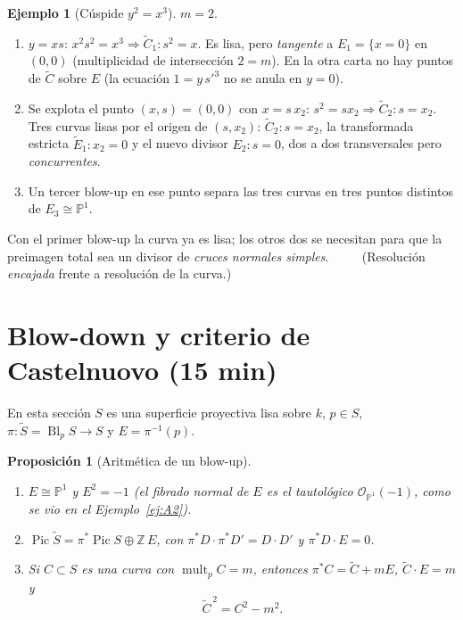 \documentclass[11pt,a4paper]{article}
\newcommand{\Bl}{\operatorname{Bl}}
\newcommand{\Pic}{\operatorname{Pic}}
\newcommand{\mult}{\operatorname{mult}}
\newcommand{\PP}{\mathbb{P}}
\newcommand{\ZZ}{\mathbb{Z}}
\newcommand{\cO}{\mathcal{O}}
\theoremstyle{plain}
\newtheorem{proposicion}[teorema]{Proposición}
\theoremstyle{definition}
\newtheorem{ejemplo}[teorema]{Ejemplo}
\theoremstyle{remark}
\begin{document}
\begin{ejemplo}[Cúspide $y^2=x^3$]\label{ej:cuspide}
$m=2$.
\begin{enumerate}[label=\textbf{Paso \arabic*.},leftmargin=*,itemsep=2pt]
\item $y=xs$: $x^2s^2=x^3\Rightarrow\tilde C_1\colon s^2=x$. Es lisa, pero \emph{tangente} a $E_1=\{x=0\}$ en $(0,0)$ (multiplicidad de intersección $2=m$). En la otra carta no hay puntos de $\tilde C$ sobre $E$ (la ecuación $1=y\,s'^3$ no se anula en $y=0$).
\item Se explota el punto $(x,s)=(0,0)$ con $x=s\,x_2$: $s^2=sx_2\Rightarrow\tilde C_2\colon s=x_2$. Tres curvas lisas por el origen de $(s,x_2)$: $\tilde C_2\colon s=x_2$, la transformada estricta $\tilde E_1\colon x_2=0$ y el nuevo divisor $E_2\colon s=0$, dos a dos transversales pero \emph{concurrentes}.
\item Un tercer blow-up en ese punto separa las tres curvas en tres puntos distintos de $E_3\cong\PP^1$.
\end{enumerate}
Con el primer blow-up la curva ya es lisa; los otros dos se necesitan para que la preimagen total sea un divisor de \emph{cruces normales simples}. $\qquad$ (Resolución \emph{encajada} frente a resolución de la curva.)
\end{ejemplo}

\section{Blow-down y criterio de Castelnuovo (15 min)}

En esta sección $S$ es una superficie proyectiva lisa sobre $k$, $p\in S$, $\pi\colon\tilde S=\Bl_pS\to S$ y $E=\pi^{-1}(p)$.

\begin{proposicion}[Aritmética de un blow-up]\label{prop:aritmetica}
\begin{enumerate}[label=(\alph*)]
\item $E\cong\PP^1$ y $E^2=-1$ (el fibrado normal de $E$ es el tautológico $\cO_{\PP^1}(-1)$, como se vio en el Ejemplo~\ref{ej:A2}).
\item $\Pic\tilde S=\pi^*\Pic S\oplus\ZZ\,E$, con $\pi^*D\cdot\pi^*D'=D\cdot D'$ y $\pi^*D\cdot E=0$.
\item Si $C\subset S$ es una curva con $\mult_pC=m$, entonces $\pi^*C=\tilde C+mE$, $\tilde C\cdot E=m$ y
\[
\tilde C^{\,2}=C^2-m^2.
\]
\end{enumerate}
\end{proposicion}
\end{document}
